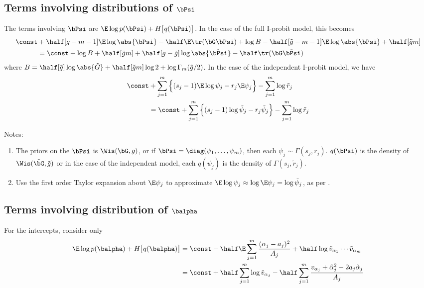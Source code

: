 \subsection{Terms involving distributions of \texorpdfstring{$\bPsi$}{$\Psi$}}

The terms involving $\bPsi$ are $\E \log p(\bPsi) + H\big[q(\bPsi)\big]$.
In the case of the full I-probit model, this becomes
\begin{align*}
  \const & + \half[g-m-1]\E \log \abs{\bPsi} - \half \E \tr(\bG\bPsi) 
  + \log B - \half[\tilde g-m-1]\E \log \abs{\bPsi} + \half[\tilde g m] \\
  &= \const  + \log B + \half[\tilde g m] + \half[g-\tilde g] \log \abs{\tilde\bPsi} - \half \tr(\bG\tilde\bPsi)
\end{align*}
where $B = \half[\tilde g] \log \abs{\tilde G} + \half[\tilde g m]\log 2 + \log \Gamma_m(\tilde g / 2)$.
In the case of the independent I-probit model, we have
\begin{align*}
  \const & + \sum_{j=1}^m \Big\{ (s_j - 1)\E \log \psi_j -  r_j \E\psi_j \Big\}
  - \sum_{j=1}^m \log \tilde r_j \\
  &= \const + \sum_{j=1}^m \Big\{ (s_j - 1)\log \tilde \psi_j   -  r_j \tilde\psi_j \Big\}
  - \sum_{j=1}^m \log \tilde r_j 
\end{align*}

Notes:
\begin{enumerate}
  \item The priors on the $\bPsi$ is $\Wis(\bG,g)$, or if $\bPsi = \diag(\psi_1,\dots,\psi_m)$, then each $\psi_j\sim \Gamma(s_j,r_j)$. $q(\bPsi)$ is the density of $\Wis(\tilde\bG,\tilde g)$ or in the case of the independent model, each $q(\psi_j)$ is the density of $\Gamma(s_j,\tilde r_j)$.
  \item Use the first order Taylor expansion about $\E\psi_j$ to approximate $\E \log \psi_j \approx \log \E \psi_j = \log \tilde \psi_j$, as per \citet{teh2007collapsed}.
\end{enumerate}

\subsection{Terms involving distribution of \texorpdfstring{$\balpha$}{$\alpha$}}

For the intercepts, consider only
\begin{align*}
  \E \log p(\balpha) + H \big[q(\balpha) \big] 
  &=  \const  - \half \E \sum_{j=1}^m \frac{(\alpha_j - a_j)^2}{A_j}    + \half \log \tilde v_{\alpha_1}\cdots\tilde v_{\alpha_m} \\ 
  &= \const + \half \sum_{j=1}^m \log \tilde v_{\alpha_j} - \half \sum_{j=1}^m \frac{v_{\alpha_j} + \tilde\alpha_j^2  -2a_j \tilde\alpha_j}{A_j} 
\end{align*}


